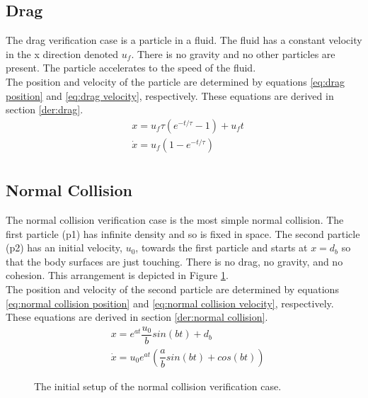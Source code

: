 \documentclass[10pt,a4paper,titlepage]{report}
\begin{document}
\subsection{Drag}
The drag verification case is a particle in a fluid. The fluid has a constant velocity in the x direction denoted $u_f$. There is no gravity and no other particles are present. The particle accelerates to the speed of the fluid.
\\The position and velocity of the particle are determined by equations \ref{eq:drag position} and \ref{eq:drag velocity}, respectively. These equations are derived in section \ref{der:drag}.
\begin{align}
&x = u_f \tau (e^{-t/\tau} - 1) + u_f t \label{eq:drag position} \\
&\dot{x} = u_f (1 - e^{-t/\tau}) \label{eq:drag velocity} \\
\end{align}
\subsection{Normal Collision}
\label{sec:normal collision verification}
The normal collision verification case is the most simple normal collision. The first particle (p1) has infinite density and so is fixed in space. The second particle (p2) has an initial velocity, $u_0$, towards the first particle and starts at $x = d_b$ so that the body surfaces are just touching. There is no drag, no gravity, and no cohesion. This arrangement is depicted in Figure \ref{fig:normal collision}.
\\The position and velocity of the second particle are determined by equations \ref{eq:normal collision position} and \ref{eq:normal collision velocity}, respectively. These equations are derived in section \ref{der:normal collision}.
\begin{align}
&x = e^{at} \dfrac{u_0}{b} sin(bt) + d_b \label{eq:normal collision position} \\
&\dot{x} = u_0 e^{at} (\dfrac{a}{b} sin(bt) + cos(bt)) \label{eq:normal collision velocity}
\end{align}
\begin{figure}[!ht]
\centering

\caption{The initial setup of the normal collision verification case.}
\label{fig:normal collision}
\end{figure}
\end{document}
